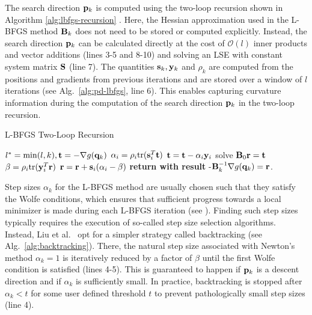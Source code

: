 The search direction $\mathbf{p}_k$ is computed using the two-loop recursion shown in Algorithm \ref{alg:lbfgs-recursion} \cite{nocedal2006, liu2017}.
Here, the Hessian approximation used in the L-BFGS method $\mathbf{B}_k$ does not need to be stored or computed explicitly. Instead, the 
search direction $\mathbf{p}_k$ can be calculated directly at the cost of $\mathcal{O}(l)$ inner products and vector additions (lines 3-5 and 8-10) 
and solving an LSE with constant system matrix $\mathbf{S}$ (line 7). The quantities $\mathbf{s}_k, \mathbf{y}_k$ and $\rho_k$ are computed from the 
positions and gradients from previous iterations and are stored over a window of $l$ iterations (see Alg.\ \ref{alg:pd-lbfgs}, line 6). This 
enables capturing curvature information during the computation of the search direction $\mathbf{p}_k$ in the two-loop recursion. 

\begin{algorithm}[tb]
\caption{L-BFGS Two-Loop Recursion}\label{alg:lbfgs-recursion}
\begin{algorithmic}[1]
\State $l^* = \min(l, k), \mathbf{t} = -\nabla g(\mathbf{q}_k)$
\State $\alpha_i = \rho_i \text{tr}(\mathbf{s}^T_i \mathbf{t})$
\State $\mathbf{t} = \mathbf{t} - \alpha_i \mathbf{y}_i$
\EndFor
\State solve $\mathbf{B}_0 \mathbf{r} = \mathbf{t}$
\State $\beta = \rho_i \text{tr}(\mathbf{y}^T_i \mathbf{r})$
\State $\mathbf{r} = \mathbf{r} + \mathbf{s}_i(\alpha_i - \beta)$
\EndFor
\State \textbf{return with result } -$\mathbf{B}^{-1}_k \nabla g(\mathbf{q}_k) = \mathbf{r}$.
\EndProcedure
\end{algorithmic}
\end{algorithm}

Step sizes $\alpha_k$ for the L-BFGS method are usually chosen such that they satisfy the Wolfe conditions, which ensures that sufficient progress 
towards a local minimizer is made during each L-BFGS iteration (see \cite{nocedal2006}). Finding such step sizes typically requires the execution of 
so-called step size selection algorithms. Instead, Liu et al.\ \cite{liu2017} opt for a simpler strategy called backtracking (see Alg.\ 
\ref{alg:backtracking}). There, the natural step size associated with Newton's method $\alpha_k = 1$ is iteratively reduced by a factor of $\beta$ 
until the first Wolfe condition is satisfied (lines 4-5). This is guaranteed to happen if $\mathbf{p}_k$ is a descent 
direction and if $\alpha_k$ is sufficiently small. In practice, backtracking is stopped after $\alpha_k < t$ for some user defined threshold $t$ to 
prevent pathologically small step sizes (line 4).


